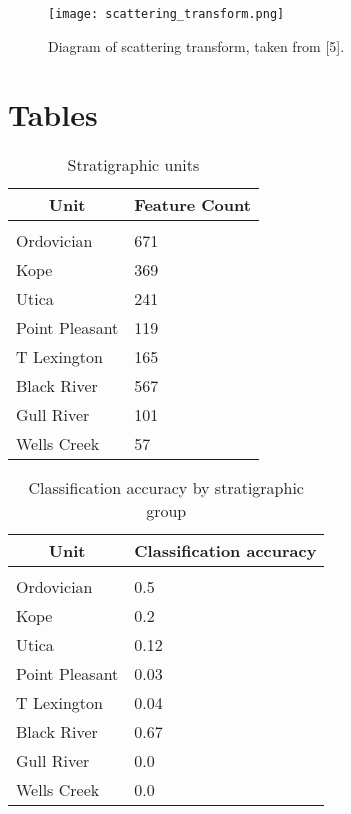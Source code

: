 \documentclass{article} %
\begin{document}
\begin{figure}[H]
\begin{center}
\texttt{[image: scattering\_transform.png]}
\end{center}
\caption{Diagram of scattering transform, taken from [5].}
\label{fig:scatter}
\end{figure}

\section{Tables}

\begin{table}[H]
\caption{Stratigraphic units}
\label{strat-table}
\begin{center}
\begin{tabular}{ll}
\multicolumn{1}{c}{\bf Unit}  &\multicolumn{1}{c}{\bf Feature Count}
\\ \hline \\
Ordovician    &671 \\
Kope             &369\\                              
Utica   &241\\
Point Pleasant  &119 \\
T Lexington   &165\\
Black River  &567 \\
Gull River  &101\\ 
Wells Creek   &57\\      
\end{tabular}
\end{center}
\end{table}

\begin{table}[H]
\caption{Classification accuracy by stratigraphic group}
\label{results-table}
\begin{center}
\begin{tabular}{ll}
\multicolumn{1}{c}{\bf Unit}  &\multicolumn{1}{c}{\bf Classification accuracy}
\\ \hline \\
Ordovician    &0.5 \\
Kope             &0.2\\                              
Utica   &0.12\\
Point Pleasant  &0.03 \\
T Lexington   &0.04\\
Black River  &0.67 \\
Gull River  &0.0\\ 
Wells Creek   &0.0\\      
\end{tabular}
\end{center}
\end{table}
\end{document}

